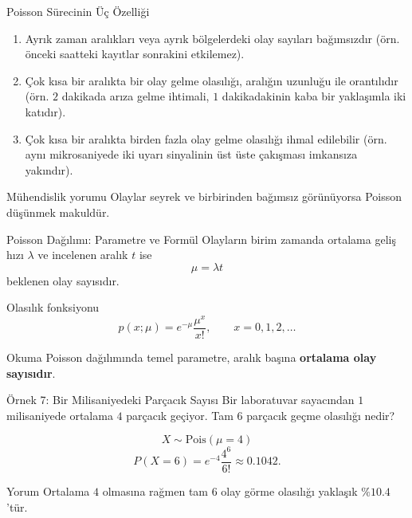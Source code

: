 \documentclass[light]{lutbeamer}
\begin{document}
\begin{frame}{Poisson Sürecinin Üç Özelliği}
    \small
    \begin{enumerate}
        \item Ayrık zaman aralıkları veya ayrık bölgelerdeki olay sayıları bağımsızdır (örn. önceki saatteki kayıtlar sonrakini etkilemez).
        \item Çok kısa bir aralıkta bir olay gelme olasılığı, aralığın uzunluğu ile orantılıdır (örn. \(2\) dakikada arıza gelme ihtimali, \(1\) dakikadakinin kaba bir yaklaşımla iki katıdır).
        \item Çok kısa bir aralıkta birden fazla olay gelme olasılığı ihmal edilebilir (örn. aynı mikrosaniyede iki uyarı sinyalinin üst üste çakışması imkansıza yakındır).
    \end{enumerate}

    \begin{block}{Mühendislik yorumu}
        Olaylar seyrek ve birbirinden bağımsız görünüyorsa Poisson düşünmek makuldür.
    \end{block}
\end{frame}

\begin{frame}{Poisson Dağılımı: Parametre ve Formül}
    \small
    Olayların birim zamanda ortalama geliş hızı \(\lambda\) ve incelenen aralık \(t\) ise
    \[
    \mu=\lambda t
    \]
    beklenen olay sayısıdır.

    \begin{block}{Olasılık fonksiyonu}
        \[
        p(x;\mu)=e^{-\mu}\frac{\mu^x}{x!},
        \qquad x=0,1,2,\dots
        \]
    \end{block}

    \begin{block}{Okuma}
        Poisson dağılımında temel parametre, aralık başına \textbf{ortalama olay sayısıdır}.
    \end{block}
\end{frame}

\begin{frame}{Örnek 7: Bir Milisaniyedeki Parçacık Sayısı}
    \small
    Bir laboratuvar sayacından \(1\) milisaniyede ortalama \(4\) parçacık geçiyor. Tam \(6\) parçacık geçme olasılığı nedir?

    \[
    X \sim \text{Pois}(\mu=4)
    \]
    \[
    P(X=6)=e^{-4}\frac{4^6}{6!}\approx 0.1042.
    \]

    \begin{exampleblock}{Yorum}
        Ortalama \(4\) olmasına rağmen tam \(6\) olay görme olasılığı yaklaşık \(\%10.4\)'tür.
    \end{exampleblock}
\end{frame}
\end{document}
